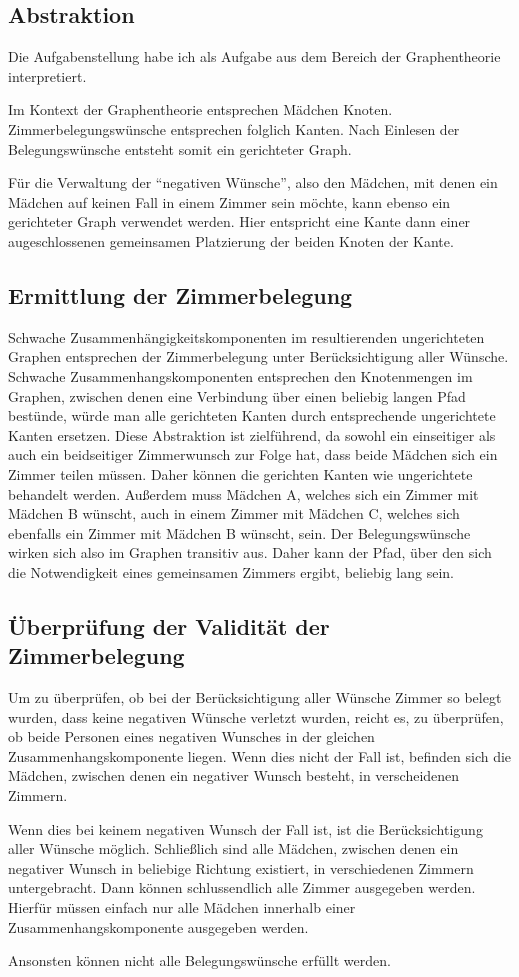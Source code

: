 \subsection{Abstraktion}
Die Aufgabenstellung habe ich als Aufgabe aus dem Bereich der Graphentheorie interpretiert.

Im Kontext der Graphentheorie entsprechen Mädchen Knoten. Zimmerbelegungswünsche entsprechen folglich Kanten.
Nach Einlesen der Belegungswünsche entsteht somit ein gerichteter Graph.

Für die Verwaltung der "`negativen Wünsche"', also den Mädchen, mit denen ein Mädchen auf keinen Fall in einem Zimmer sein möchte, kann ebenso ein gerichteter Graph verwendet werden.
Hier entspricht eine Kante dann einer augeschlossenen gemeinsamen Platzierung der beiden Knoten der Kante.

\subsection{Ermittlung der Zimmerbelegung}
Schwache Zusammenhängigkeitskomponenten im resultierenden ungerichteten Graphen entsprechen der Zimmerbelegung unter Berücksichtigung aller Wünsche. 
Schwache Zusammenhangskomponenten\autocite[Definiton. Gerichtete Graphen]{WikiZus} entsprechen den Knotenmengen im Graphen, zwischen denen eine Verbindung über einen beliebig langen Pfad bestünde, würde man alle gerichteten Kanten durch entsprechende ungerichtete Kanten ersetzen.
Diese Abstraktion ist zielführend, da sowohl ein einseitiger als auch ein beidseitiger Zimmerwunsch zur Folge hat, dass beide Mädchen sich ein Zimmer teilen müssen. Daher können die gerichten Kanten wie ungerichtete behandelt werden.
Außerdem muss Mädchen A, welches sich ein Zimmer mit Mädchen B wünscht, auch in einem Zimmer mit Mädchen C, welches sich ebenfalls ein Zimmer mit Mädchen B wünscht, sein. Der Belegungswünsche wirken sich also im Graphen transitiv aus. Daher kann der Pfad, über den sich die Notwendigkeit eines gemeinsamen Zimmers ergibt, beliebig lang sein.

\subsection{Überprüfung der Validität der Zimmerbelegung}
Um zu überprüfen, ob bei der Berücksichtigung aller Wünsche Zimmer so belegt wurden, dass keine negativen Wünsche verletzt wurden,
reicht es, zu überprüfen, ob beide Personen eines negativen Wunsches in der gleichen Zusammenhangskomponente liegen. Wenn dies nicht der Fall ist, befinden sich die Mädchen, zwischen denen ein negativer Wunsch besteht, in verscheidenen Zimmern.

Wenn dies bei keinem negativen Wunsch der Fall ist, ist die Berücksichtigung aller Wünsche möglich.
Schließlich sind alle Mädchen, zwischen denen ein negativer Wunsch in beliebige Richtung existiert, in verschiedenen Zimmern untergebracht.
Dann können schlussendlich alle Zimmer ausgegeben werden. Hierfür müssen einfach nur alle Mädchen innerhalb einer Zusammenhangskomponente ausgegeben werden.

Ansonsten können nicht alle Belegungswünsche erfüllt werden.
